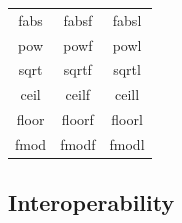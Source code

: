 \begin{table}[h]
\begin{center}
\begin{tabular}{c|c|c}
 fabs & fabsf & fabsl \\
 pow & powf & powl \\
 sqrt & sqrtf & sqrtl \\


 ceil & ceilf & ceill \\
 floor & floorf & floorl \\

 fmod & fmodf & fmodl \\ \hline
%
%

 \end{tabular} 
 \end{center}
\end{table}


\subsection{Interoperability}

